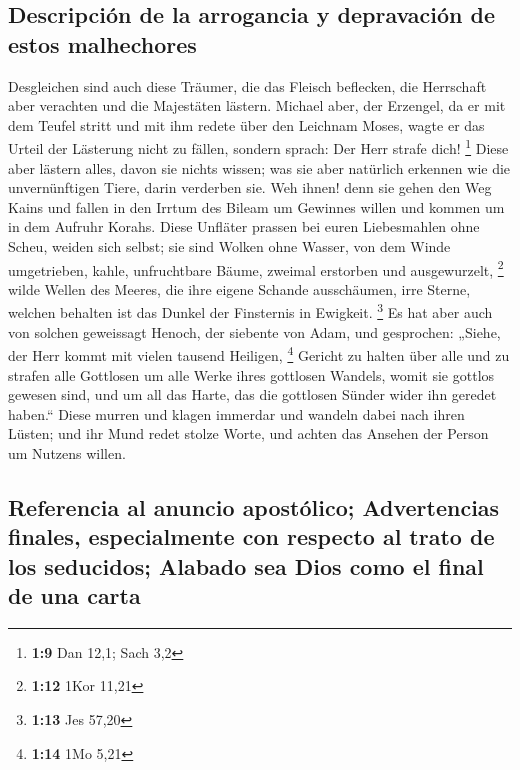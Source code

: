 \hypertarget{descripciuxf3n-de-la-arrogancia-y-depravaciuxf3n-de-estos-malhechores}{%
\subsection{Descripción de la arrogancia y depravación de estos
malhechores}\label{descripciuxf3n-de-la-arrogancia-y-depravaciuxf3n-de-estos-malhechores}}

 Desgleichen sind auch diese Träumer, die das Fleisch
beflecken, die Herrschaft aber verachten und die Majestäten lästern.
 Michael aber, der Erzengel, da er mit dem Teufel stritt
und mit ihm redete über den Leichnam Moses, wagte er das Urteil der
Lästerung nicht zu fällen, sondern sprach: Der Herr strafe dich!
\footnote{\textbf{1:9} Dan 12,1; Sach 3,2}  Diese aber
lästern alles, davon sie nichts wissen; was sie aber natürlich erkennen
wie die unvernünftigen Tiere, darin verderben sie.  Weh
ihnen! denn sie gehen den Weg Kains und fallen in den Irrtum des Bileam
um Gewinnes willen und kommen um in dem Aufruhr Korahs. 
Diese Unfläter prassen bei euren Liebesmahlen ohne Scheu, weiden sich
selbst; sie sind Wolken ohne Wasser, von dem Winde umgetrieben, kahle,
unfruchtbare Bäume, zweimal erstorben und ausgewurzelt, \footnote{\textbf{1:12}
  1Kor 11,21}  wilde Wellen des Meeres, die ihre eigene
Schande ausschäumen, irre Sterne, welchen behalten ist das Dunkel der
Finsternis in Ewigkeit. \footnote{\textbf{1:13} Jes 57,20}
 Es hat aber auch von solchen geweissagt Henoch, der
siebente von Adam, und gesprochen: „Siehe, der Herr kommt mit vielen
tausend Heiligen, \footnote{\textbf{1:14} 1Mo 5,21} 
Gericht zu halten über alle und zu strafen alle Gottlosen um alle Werke
ihres gottlosen Wandels, womit sie gottlos gewesen sind, und um all das
Harte, das die gottlosen Sünder wider ihn geredet haben.``
 Diese murren und klagen immerdar und wandeln dabei nach
ihren Lüsten; und ihr Mund redet stolze Worte, und achten das Ansehen
der Person um Nutzens willen.

\hypertarget{referencia-al-anuncio-apostuxf3lico-advertencias-finales-especialmente-con-respecto-al-trato-de-los-seducidos-alabado-sea-dios-como-el-final-de-una-carta}{%
\subsection{Referencia al anuncio apostólico; Advertencias finales,
especialmente con respecto al trato de los seducidos; Alabado sea Dios
como el final de una
carta}\label{referencia-al-anuncio-apostuxf3lico-advertencias-finales-especialmente-con-respecto-al-trato-de-los-seducidos-alabado-sea-dios-como-el-final-de-una-carta}}

